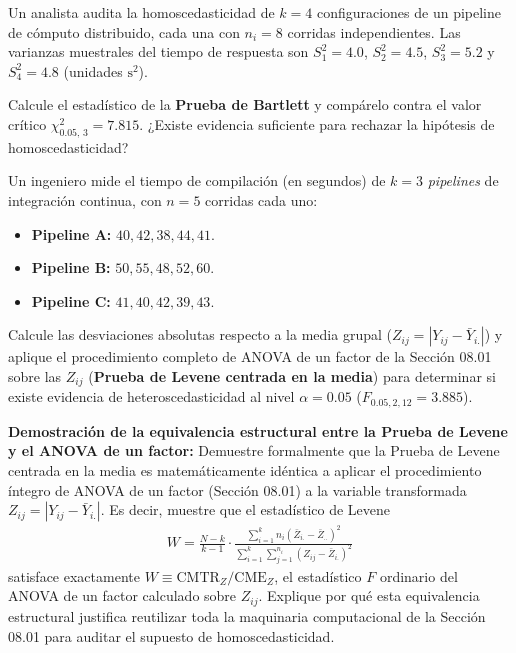 \begin{problema}
	\label{prob:bartlett_pipelines_ci}
	Un analista audita la homoscedasticidad de $k = 4$ configuraciones de un pipeline de cómputo distribuido, cada una con $n_i = 8$ corridas independientes. Las varianzas muestrales del tiempo de respuesta son $S_1^2 = 4.0$, $S_2^2 = 4.5$, $S_3^2 = 5.2$ y $S_4^2 = 4.8$ (unidades $\text{s}^2$).

	Calcule el estadístico de la \textbf{Prueba de Bartlett} y compárelo contra el valor crítico $\chi^2_{0.05, \, 3} = 7.815$. ¿Existe evidencia suficiente para rechazar la hipótesis de homoscedasticidad?
\end{problema}

\begin{problema}
	\label{prob:levene_pipelines_cicd}
	Un ingeniero mide el tiempo de compilación (en segundos) de $k = 3$ \emph{pipelines} de integración continua, con $n = 5$ corridas cada uno:
	\begin{itemize}
		\item \textbf{Pipeline A:} $40, 42, 38, 44, 41$.
		\item \textbf{Pipeline B:} $50, 55, 48, 52, 60$.
		\item \textbf{Pipeline C:} $41, 40, 42, 39, 43$.
	\end{itemize}
	Calcule las desviaciones absolutas respecto a la media grupal ($Z_{ij} = |Y_{ij} - \bar{Y}_{i.}|$) y aplique el procedimiento completo de ANOVA de un factor de la Sección 08.01 sobre las $Z_{ij}$ (\textbf{Prueba de Levene centrada en la media}) para determinar si existe evidencia de heteroscedasticidad al nivel $\alpha = 0.05$ ($F_{0.05, 2, 12} = 3.885$).
\end{problema}

\begin{problema}
	\label{prob:levene_como_anova_demo}
	\textbf{Demostración de la equivalencia estructural entre la Prueba de Levene y el ANOVA de un factor:}
	Demuestre formalmente que la Prueba de Levene centrada en la media es matemáticamente idéntica a aplicar el procedimiento íntegro de ANOVA de un factor (Sección 08.01) a la variable transformada $Z_{ij} = |Y_{ij} - \bar{Y}_{i.}|$. Es decir, muestre que el estadístico de Levene
	\begin{align}
		W = \frac{N-k}{k-1} \cdot \frac{\sum_{i=1}^k n_i (\bar{Z}_{i.} - \bar{Z}_{..})^2}{\sum_{i=1}^k \sum_{j=1}^{n_i} (Z_{ij} - \bar{Z}_{i.})^2}
	\end{align}
	satisface exactamente $W \equiv \text{CMTR}_Z / \text{CME}_Z$, el estadístico $F$ ordinario del ANOVA de un factor calculado sobre $Z_{ij}$. Explique por qué esta equivalencia estructural justifica reutilizar toda la maquinaria computacional de la Sección 08.01 para auditar el supuesto de homoscedasticidad.
\end{problema}

